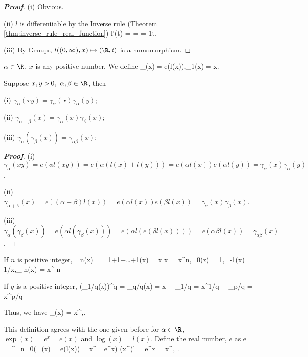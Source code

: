 \begin{proof}[{\bf Proof}]
(i) Obvious.

(ii) $l$ is differentiable by the Inverse rule (Theorem \ref{thm:inverse_rule_real_function})
\be
l'(t) =  =  = \frac 1t.
\ee

(iii) By Groups, $l((0,\infty),x)\mapsto (\R,t)$ is a homomorphism.
\end{proof}

$\alpha\in\R$, $x$ is any positive number. We define 
\be
\gamma_\alpha (x) = e(\alpha l(x)),\quad \gamma_1(x) = x.
\ee 

\begin{theorem}
Suppose $x,y>0,\ \alpha,\beta\in\R$, then

(i) $\gamma_\alpha(xy) = \gamma_\alpha(x)\gamma_\alpha(y)$;

(ii) $\gamma_{\alpha+\beta}(x) = \gamma_\alpha(x)\gamma_\beta(x)$;

(iii) $\gamma_\alpha(\gamma_\beta(x)) = \gamma_{\alpha\beta}(x)$;
\end{theorem}

\begin{proof}[{\bf Proof}]
(i) $\gamma_\alpha(xy) = e(\alpha l(xy)) = e(\alpha (l(x)+l(y))) = e(\alpha l(x))e(\alpha l(y)) = \gamma_\alpha(x)\gamma_\alpha(y)$.

(ii) $\gamma_{\alpha+\beta}(x) = e((\alpha+\beta) l(x)) = e(\alpha l(x))e(\beta l(x)) = \gamma_\alpha(x)\gamma_\beta(x)$.

(iii) $\gamma_\alpha(\gamma_\beta(x)) = e(\alpha l(\gamma_\beta(x))) = e(\alpha l(e(\beta l(x)))) = e(\alpha\beta l(x))= \gamma_{\alpha\beta}(x)$.
\end{proof}

If $n$ is positive integer,
\be
\gamma_n(x) = \gamma_{1+1+\dots+1}(x) = x \cdots x = x^n,\quad \gamma_0(x) = 1,\quad \gamma_{-1}(x) = 1/x,\quad \gamma_{-n}(x) = x^{-n}
\ee

If $q$ is a positive integer, 
\be
(\gamma_{1/q}(x))^q = \gamma_{q/q}(x) = x \ \ra \ \gamma_{1/q} = x^{1/q} \ \ra \ \gamma_{p/q} = x^{p/q}
\ee

Thus, we have
\be
\gamma_\alpha(x) = x^\alpha,\quad \alpha \in \R.
\ee

This definition agrees with the one given before for $\alpha\in\R$, $\exp(x) = e^x = e(x)$ and $\log(x) = l(x)$. Define the real number, $e$ as 
\be
e = \sum^\infty_{n=0}\quad\quad (\gamma_\alpha (x) = e(\alpha l(x)) \ \ra \ x^\alpha = e^{\alpha \log x})
\ee
\be
(x^\alpha)' = e^{\alpha \log x}  = \alpha x^{}, \quad \alpha \in \R.
\ee

